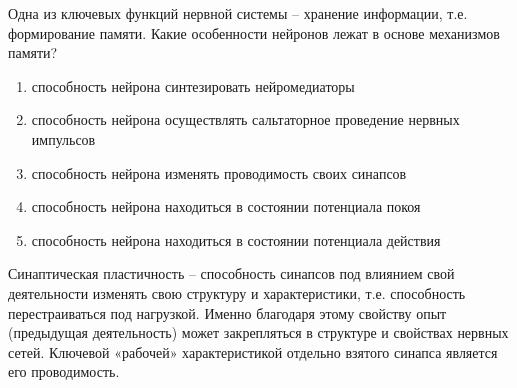 
Одна из ключевых функций нервной системы – хранение информации, т.е. формирование памяти. Какие особенности нейронов лежат в основе механизмов памяти?

\begin{enumerate}
    \item способность нейрона синтезировать нейромедиаторы
    \item способность нейрона осуществлять сальтаторное проведение нервных импульсов
    \item способность нейрона изменять проводимость своих синапсов
    \item способность нейрона находиться в состоянии потенциала покоя
    \item способность нейрона находиться в состоянии потенциала действия
\end{enumerate}

\explanationSection

Синаптическая пластичность – способность синапсов под влиянием свой деятельности изменять свою структуру и характеристики, т.е. способность перестраиваться под нагрузкой. Именно благодаря этому свойству опыт (предыдущая деятельность) может закрепляться в структуре и свойствах нервных сетей. Ключевой «рабочей» характеристикой отдельно взятого синапса является его проводимость.

